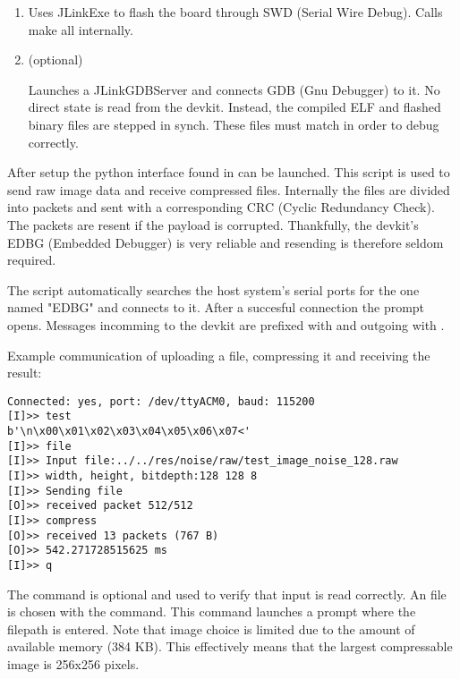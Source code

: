 \documentclass[12pt, a4paper]{article}
\begin{document}
\begin{enumerate}
    \item {}

        \medskip
        \noindent
        Uses JLinkExe to flash the board through SWD (Serial Wire Debug). 
        Calls make all internally.

    \item (optional) 

        \medskip
        \noindent
        Launches a JLinkGDBServer and connects GDB (Gnu Debugger) to it. 
        No direct state is read from the devkit. 
        Instead, the compiled ELF and flashed binary files are stepped in synch. 
        These files must match in order to debug correctly. 
\end{enumerate}

\newpage
\noindent
After setup the python interface found in   can be launched. 
This script is used to send raw image data and receive compressed files. 
Internally the files are divided into packets and sent with a corresponding CRC (Cyclic Redundancy Check).
The packets are resent if the payload is corrupted. 
Thankfully, the devkit's EDBG (Embedded Debugger) is very reliable and resending is therefore seldom required.

\medskip
\noindent
The script automatically searches the host system's serial ports for the one named "EDBG" and connects to it. 
After a succesful connection the prompt opens. 
Messages incomming to the devkit are prefixed with \code{[I]} and outgoing with \code{[O]}.

\medskip
\noindent
Example communication of uploading a file, compressing it and receiving the result:

\bigskip
\begin{minipage}{\textwidth}
\begin{verbatim}
Connected: yes, port: /dev/ttyACM0, baud: 115200
[I]>> test
b'\n\x00\x01\x02\x03\x04\x05\x06\x07<'
[I]>> file
[I]>> Input file:../../res/noise/raw/test_image_noise_128.raw
[I]>> width, height, bitdepth:128 128 8
[I]>> Sending file
[O]>> received packet 512/512
[I]>> compress
[O]>> received 13 packets (767 B)
[O]>> 542.271728515625 ms
[I]>> q
\end{verbatim}
\end{minipage}

\bigskip
\noindent
The  command is optional and used to verify that input is read correctly. 
An file is chosen with the  command. 
This command launches a prompt where the filepath is entered. 
Note that image choice is limited due to the amount of available memory (384 KB). 
This effectively means that the largest compressable image is 256x256 pixels. 
\end{document}
